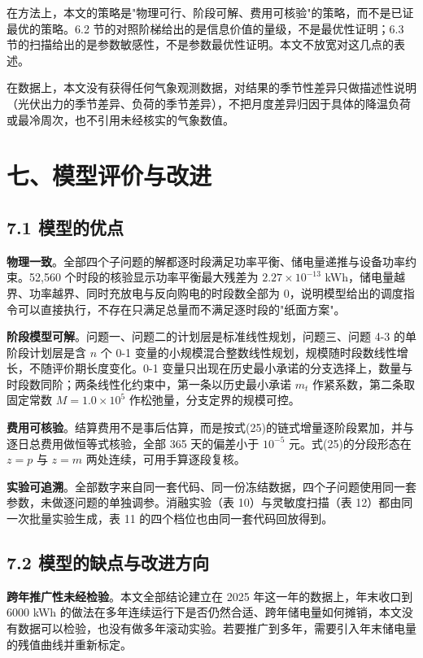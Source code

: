 \documentclass[12pt,a4paper]{ctexart}
\begin{document}
在方法上，本文的策略是"物理可行、阶段可解、费用可核验"的策略，而不是已证最优的策略。6.2 节的对照阶梯给出的是信息价值的量级，不是最优性证明；6.3 节的扫描给出的是参数敏感性，不是参数最优性证明。本文不放宽对这几点的表述。

在数据上，本文没有获得任何气象观测数据，对结果的季节性差异只做描述性说明（光伏出力的季节差异、负荷的季节差异），不把月度差异归因于具体的降温负荷或最冷周次，也不引用未经核实的气象数值。

\section*{七、模型评价与改进}

\subsection*{7.1 模型的优点}

\textbf{物理一致}。全部四个子问题的解都逐时段满足功率平衡、储电量递推与设备功率约束。52,560 个时段的核验显示功率平衡最大残差为 $2.27\times10^{-13}$ kWh，储电量越界、功率越界、同时充放电与反向购电的时段数全部为 0，说明模型给出的调度指令可以直接执行，不存在只满足总量而不满足逐时段的"纸面方案"。

\textbf{阶段模型可解}。问题一、问题二的计划层是标准线性规划，问题三、问题 4-3 的单阶段计划层是含 $n$ 个 0-1 变量的小规模混合整数线性规划，规模随时段数线性增长，不随评价期长度变化。0-1 变量只出现在历史最小承诺的分支选择上，数量与时段数同阶；两条线性化约束中，第一条以历史最小承诺 $m_t$ 作紧系数，第二条取固定常数 $M=1.0\times10^{5}$ 作松弛量，分支定界的规模可控。

\textbf{费用可核验}。结算费用不是事后估算，而是按式(25)的链式增量逐阶段累加，并与逐日总费用做恒等式核验，全部 365 天的偏差小于 $10^{-5}$ 元。式(25)的分段形态在 $z=p$ 与 $z=m$ 两处连续，可用手算逐段复核。

\textbf{实验可追溯}。全部数字来自同一套代码、同一份冻结数据，四个子问题使用同一套参数，未做逐问题的单独调参。消融实验（表 10）与灵敏度扫描（表 12）都由同一次批量实验生成，表 11 的四个档位也由同一套代码回放得到。

\subsection*{7.2 模型的缺点与改进方向}

\textbf{跨年推广性未经检验}。本文全部结论建立在 2025 年这一年的数据上，年末收口到 6000 kWh 的做法在多年连续运行下是否仍然合适、跨年储电量如何摊销，本文没有数据可以检验，也没有做多年滚动实验。若要推广到多年，需要引入年末储电量的残值曲线并重新标定。
\end{document}
